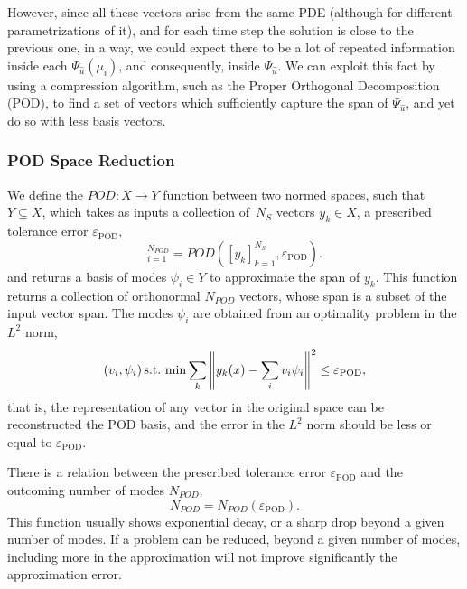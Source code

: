 \documentclass[../../thesis.tex]{subfiles}
\newcommand{\epspod}{\ensuremath{\varepsilon_\text{POD}}}
\begin{document}
However, since all these vectors arise from the same PDE (although for different parametrizations of it), and for each time step the solution is close to the previous one, in a way, we could expect there to be a lot of repeated information inside each $\Psi_{\hat{u}}(\mu_i)$, and consequently, inside $\Psi_{\hat{u}}$.
We can exploit this fact by using a compression algorithm, such as the Proper Orthogonal Decomposition (POD), to find a set of vectors which sufficiently capture the span of $\Psi_{\hat{u}}$, and yet do so with less basis vectors. 


\subsubsection{POD Space Reduction}
\label{sec:1d_rom_burgers_basis_construction_pod}
We define the $POD: X \rightarrow Y$ function between two normed spaces, 
such that $Y \subseteq  X$, 
which takes as inputs a collection of~$N_S$ vectors $y_k \in X$,
a prescribed tolerance error $\epspod$,
\begin{equation}
    [\psi_i]_{i=1}^{N_{POD}} = POD\left([y_k]_{k=1}^{N_S}, \epspod\right).
\end{equation}
and returns a basis of modes $\psi_i \in Y$ to approximate the span of $y_k$.
This function returns a collection of orthonormal $N_{POD}$ vectors, whose span is a subset of the input vector span.
The modes $\psi_i$ are obtained from an optimality problem in the $L^2$ norm,
\begin{equation}
    (v_i, \psi_i) \, \text{s.t.} \, \min \sum_k \norm{y_k(x) - \sum_i v_i \psi_i}^2 \leq \epspod,
\end{equation}
that is, the representation of any vector in the original space can be reconstructed the POD basis, 
and the error in the $L^2$ norm should be less or equal to \epspod.

There is a relation between the prescribed tolerance error $\epspod$ 
and the outcoming number of modes $N_{POD}$, 
\begin{equation}
    N_{POD} = N_{POD}(\epspod).
\end{equation}
This function usually shows exponential decay, or a sharp drop beyond a given number of modes.
If a problem can be reduced, beyond a given number of modes, 
including more in the approximation will not improve significantly the approximation error.
\end{document}
